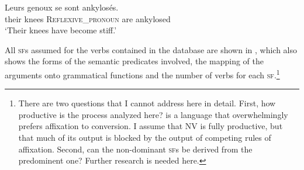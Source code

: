 \documentclass[output=paper]{langsci/langscibook}
\begin{document}
\ex\label{ex:Schwarze:13} \gll Leurs genoux se sont ankylosés.\\
their knees \textsc{Reflexive\_pronoun} are ankylosed\\
\glt `Their knees have become stiff.'\\
\z

All \textsc{sf}s assumed for the verbs contained in the database are shown in , which also shows the forms of the semantic predicates involved,
the mapping of the arguments onto grammatical functions and the number of verbs for each \textsc{sf}.\footnote{There are two questions that I cannot address here in detail. First, how productive is the process analyzed here?  is a language that overwhelmingly prefers affixation to conversion. I assume that N\textrightarrow{}V is fully productive, but that much of its output is blocked by the output of competing rules of affixation. Second, can the non-dominant \textsc{sf}s be derived from the predominent one? Further research is needed here.}


\begin{table}
\caption{Underspecified semantic forms of converted denominal verbs}
\label{tab:Schwarze:3}
\end{table}
\end{document}
